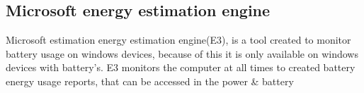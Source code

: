 \subsection*{Microsoft energy estimation engine}
Microsoft estimation energy estimation engine(E3), is a tool created to monitor battery usage on windows devices, because of this it is only available on windows devices with battery's. E3 monitors the computer at all times to created battery energy usage reports, that can be accessed in the power & battery 